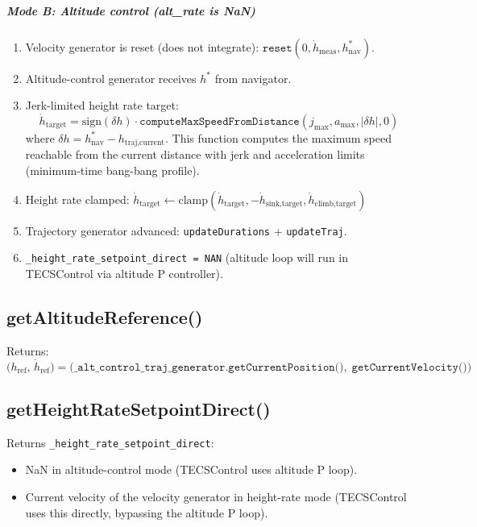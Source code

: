 \documentclass[12pt,a4paper]{article}
\begin{document}
\subparagraph{Mode B: Altitude control (alt\_rate is NaN)}

\begin{enumerate}
  \item Velocity generator is reset (does not integrate):
        $\texttt{reset}(0, \dot{h}_{\text{meas}}, h^*_{\text{nav}})$.
  \item Altitude-control generator receives $h^*$ from navigator.
  \item Jerk-limited height rate target:
        \begin{equation}
          \dot{h}_{\text{target}} = \text{sign}(\delta h) \cdot
            \texttt{computeMaxSpeedFromDistance}(j_{\max}, a_{\max}, |\delta h|, 0)
        \end{equation}
        where $\delta h = h^*_{\text{nav}} - h_{\text{traj,current}}$.
        This function computes the maximum speed reachable from the
        current distance with jerk and acceleration limits
        (minimum-time bang-bang profile).
  \item Height rate clamped:
        $\dot{h}_{\text{target}} \leftarrow \text{clamp}(\dot{h}_{\text{target}},
        -\dot{h}_{\text{sink,target}}, \dot{h}_{\text{climb,target}})$
  \item Trajectory generator advanced: \texttt{updateDurations} + \texttt{updateTraj}.
  \item \texttt{\_height\_rate\_setpoint\_direct = NAN} (altitude loop
        will run in TECSControl via altitude P controller).
\end{enumerate}

\subsection{getAltitudeReference()}

Returns:
\begin{equation}
  \bigl(h_{\text{ref}},\,\dot{h}_{\text{ref}}\bigr)
  = \bigl(\texttt{\_alt\_control\_traj\_generator.getCurrentPosition()},\;
           \texttt{getCurrentVelocity()}\bigr)
\end{equation}

\subsection{getHeightRateSetpointDirect()}

Returns \texttt{\_height\_rate\_setpoint\_direct}:
\begin{itemize}
  \item NaN in altitude-control mode (TECSControl uses altitude P loop).
  \item Current velocity of the velocity generator in height-rate mode
        (TECSControl uses this directly, bypassing the altitude P loop).
\end{itemize}
\end{document}

